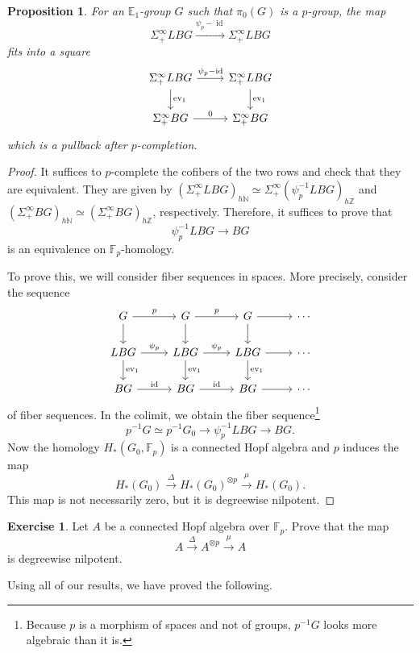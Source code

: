 \documentclass[10pt, oneside]{memoir}
\newtheorem{prop}[thm]{Proposition}
\theoremstyle{definition}
\newtheorem{exer}[thm]{Exercise}
\theoremstyle{remark}
\theoremstyle{plain}
\theoremstyle{definition}
\theoremstyle{remark}
\newcommand{\N}{\mathbb{N}}
\newcommand{\Z}{\mathbb{Z}}
\newcommand{\E}{\mathbb{E}}
\newcommand{\F}{\mathbb{F}}
\newcommand{\on}[1]{\operatorname{#1}}
\newcommand{\1}{\mathbf{1}}
\newcommand{\2}{\mathbf{2}}
\newcommand{\3}{\mathbf{3}}
\DeclareMathOperator{\ev}{ev}
\begin{document}
\begin{prop}
    For an $\E_1$-group $G$ such that $\pi_0(G)$ is a $p$-group, the map
    \[ \Sigma_+^{\infty} LBG \xrightarrow{\psi_p - \on{id}} \Sigma_+^{\infty} LBG \]
    fits into a square
    \begin{equation*}
    \begin{tikzcd}
        \Sigma_+^{\infty} LBG \ar{r}{\psi_p - \on{id}} \ar{d}{\ev_1} & \Sigma_+^{\infty} LBG \ar{d}{\ev_1} \\
        \Sigma_+^{\infty} BG \ar{r}{0} & \Sigma_+^{\infty} BG
    \end{tikzcd}
    \end{equation*}
    which is a pullback after $p$-completion.
\end{prop}

\begin{proof}
    It suffices to $p$-complete the cofibers of the two rows and check that they are equivalent. They are given by $(\Sigma_+^{\infty} LBG)_{h\N} \simeq \Sigma_+^{\infty} (\psi_p^{-1} LBG)_{h\Z}$ and $(\Sigma_+^{\infty} BG)_{h\N} \simeq (\Sigma_+^{\infty} BG)_{h\Z}$, respectively. Therefore, it suffices to prove that
    \[ \psi_p^{-1} LBG \to BG \]
    is an equivalence on $\F_p$-homology.

    To prove this, we will consider fiber sequences in spaces. More precisely, consider the sequence
    \begin{equation*}
    \begin{tikzcd}
        G \ar{r}{p} \ar{d} & G \ar{r}{p} \ar{d} & G \ar{r} \ar{d} & \cdots \\
        LBG \ar{r}{\psi_p} \ar{d}{\ev_1} & LBG \ar{r}{\psi_p} \ar{d}{\ev_1} & LBG \ar{r} \ar{d}{\ev_1} & \cdots \\
        BG \ar{r}{\on{id}} & BG \ar{r}{\on{id}}  & BG \ar{r} & \cdots
    \end{tikzcd}
    \end{equation*}
    of fiber sequences. In the colimit, we obtain the fiber sequence\footnote{Because $p$ is a morphism of spaces and not of groups, $p^{-1}G$ looks more algebraic than it is.}
    \[ p^{-1}G \simeq p^{-1} G_0 \to \psi_p^{-1} LBG \to BG. \]
    Now the homology $H_*(G_0, \F_p)$ is a connected Hopf algebra and $p$ induces the map
    \[ H_*(G_0) \xrightarrow{\Delta} H_*(G_0)^{\otimes p} \xrightarrow{\mu} H_*(G_0). \]
    This map is not necessarily zero, but it is degreewise nilpotent.
\end{proof}

\begin{exer}
    Let $A$ be a connected Hopf algebra over $\F_p$. Prove that the map
    \[ A \xrightarrow{\Delta} A^{\otimes p} \xrightarrow{\mu} A \]
    is degreewise nilpotent.
\end{exer}
Using all of our results, we have proved the following.
\end{document}
